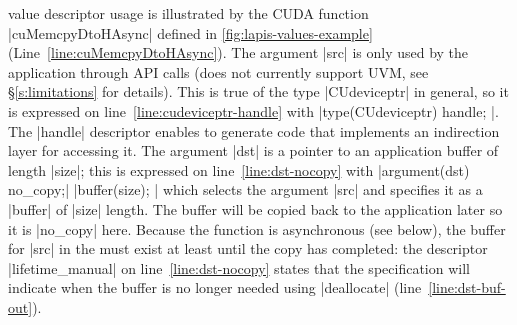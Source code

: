 {
\Speclang value descriptor usage is illustrated by the CUDA function \spec|cuMemcpyDtoHAsync| defined in \autoref{fig:lapis-values-example} (Line~\ref{line:cuMemcpyDtoHAsync}).
The argument \spec|src| is only used by the application through API calls
(\model does not currently support UVM, see \S\ref{s:limitations} for details).
This is true of the type \spec|CUdeviceptr| in general, so it
is expressed on line~\ref{line:cudeviceptr-handle} with \spec|type(CUdeviceptr) { handle; }|.
The \spec|handle| descriptor enables \model to generate code that implements an indirection layer for accessing it.
The argument \spec|dst| is a pointer to an application buffer of length \spec|size|; this is expressed on line~\ref{line:dst-nocopy} with \spec|argument(dst) { no_copy;| \spec|buffer(size); }| which selects the argument \spec|src| and specifies it as a \spec|buffer| of \spec|size| length.
The buffer will be copied back to the application later so it is \spec|no_copy| here.
Because the function is asynchronous (see below), the buffer for \spec|src| in the \worker must exist at least until the copy has completed:
the descriptor \spec|lifetime_manual| on line~\ref{line:dst-nocopy} states that the specification will indicate when the buffer is no longer needed using \spec|deallocate| (line~\ref{line:dst-buf-out}).




}
